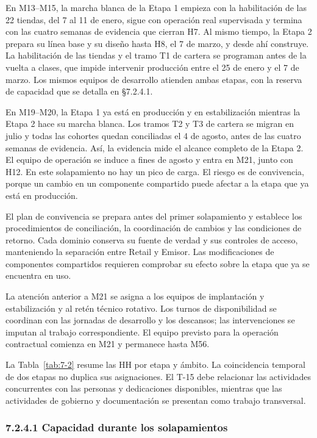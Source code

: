 \documentclass[11pt]{article}
\begin{document}
En M13--M15, la marcha blanca de la Etapa 1 empieza con la habilitación de las 22 tiendas, del 7 al 11 de enero, sigue con operación real supervisada y termina con las cuatro semanas de evidencia que cierran H7. Al mismo tiempo, la Etapa 2 prepara su línea base y su diseño hasta H8, el 7 de marzo, y desde ahí construye. La habilitación de las tiendas y el tramo T1 de cartera se programan antes de la vuelta a clases, que impide intervenir producción entre el 25 de enero y el 7 de marzo. Los mismos equipos de desarrollo atienden ambas etapas, con la reserva de capacidad que se detalla en §7.2.4.1.

En M19--M20, la Etapa 1 ya está en producción y en estabilización mientras la Etapa 2 hace su marcha blanca. Los tramos T2 y T3 de cartera se migran en julio y todas las cohortes quedan conciliadas el 4 de agosto, antes de las cuatro semanas de evidencia. Así, la evidencia mide el alcance completo de la Etapa 2. El equipo de operación se induce a fines de agosto y entra en M21, junto con H12. En este solapamiento no hay un pico de carga. El riesgo es de convivencia, porque un cambio en un componente compartido puede afectar a la etapa que ya está en producción.

El plan de convivencia se prepara antes del primer solapamiento y establece los procedimientos de conciliación, la coordinación de cambios y las condiciones de retorno. Cada dominio conserva su fuente de verdad y sus controles de acceso, manteniendo la separación entre Retail y Emisor. Las modificaciones de componentes compartidos requieren comprobar su efecto sobre la etapa que ya se encuentra en uso.

La atención anterior a M21 se asigna a los equipos de implantación y estabilización y al retén técnico rotativo. Los turnos de disponibilidad se coordinan con las jornadas de desarrollo y los descansos; las intervenciones se imputan al trabajo correspondiente. El equipo previsto para la operación contractual comienza en M21 y permanece hasta M56.

La Tabla~\ref{tab:7-2} resume las HH por etapa y ámbito. La coincidencia temporal de dos etapas no duplica sus asignaciones. El T-15 debe relacionar las actividades concurrentes con las personas y dedicaciones disponibles, mientras que las actividades de gobierno y documentación se presentan como trabajo transversal.

\subsubsection{7.2.4.1 Capacidad durante los solapamientos}
\end{document}
